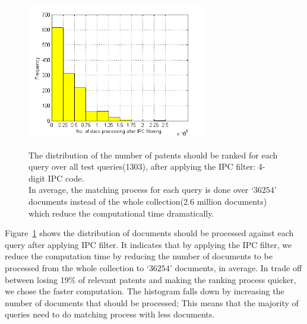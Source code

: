 \begin{figure}[t!]
   \centering
   \includegraphics[width=0.70\textwidth,height=68mm]{figs/ipcfilter-histo.png}
   \caption{The distribution of the number of patents should be ranked for each query over all test queries(1303), after applying the IPC filter: 4-digit IPC code.\\
In average, the matching process for each query is done over  `$ 36254 $' documents instead of the whole collection(2.6 million documents) which reduce the computational time dramatically.}   
   \label{fig:ipcfilter-histo} 
\end{figure}

Figure~\ref{fig:ipcfilter-histo} shows the distribution of documents should be processed against each query after applying IPC filter. It indicates that by applying the IPC filter, we reduce the computation time by reducing the number of documents to be processed from the whole collection to `$ 36254 $' documents, in average. In trade off between losing 19\% of relevant patents and making the ranking process quicker, we chose the faster computation. The histogram falls down by increasing the number of documents that should be processed; This means that the majority of queries need to do matching process with less documents. 
